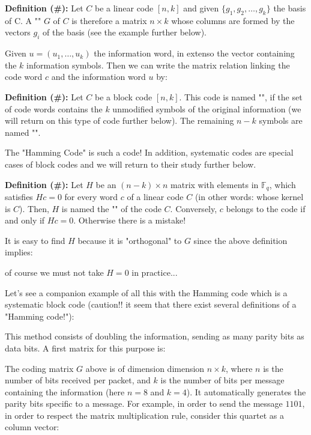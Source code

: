 	\textbf{Definition (\#\mydef):} Let $C$ be a linear code $[n, k]$ and given $\{g_1,g_2,\ldots,g_k\}$ the basis of C. A "" $G$ of $C$ is therefore a matrix $n\times k$ whose columns are formed by the vectors $g_i$ of the basis (see the example further below).

	Given $u=(u_1,\ldots,u_k)$ the information word, in extenso the vector containing the $k$ information symbols. Then we can write the matrix relation linking the code word $c$ and the information word $u$ by:
	
	
	\textbf{Definition (\#\mydef):} Let $C$ be a block code $[n, k]$. This code is named "", if the set of code words contains the $k$ unmodified symbols of the original information (we will return on this type of code further below). The remaining $n-k$ symbols are named "".
	\begin{tcolorbox}[title=Remark,colframe=black,arc=10pt]
	The "Hamming Code" is such a code! In addition, systematic codes are special cases of block codes and we will return to their study further below.
	\end{tcolorbox}
	
	\textbf{Definition (\#\mydef):} Let $H$ be an $(n-k)\times n$ matrix with elements in $\mathbb{F}_q$, which satisfies $Hc=0$ for every word $c$ of a linear code $C$ (in other words: whose kernel is $C$). Then, $H$ is named the "" of the code $C$. Conversely, $c$ belongs to the code if and only if $Hc=0$. Otherwise there is a mistake!
	\begin{tcolorbox}[title=Remark,colframe=black,arc=10pt]
	It is easy to find $H$ because it is "orthogonal" to $G$ since the above definition implies:
	
	of course we must not take $H = 0$ in practice...
	\end{tcolorbox}
	Let's see a companion example of all this with the Hamming code which is a systematic block code (caution!! it seem that there exist several definitions of a "Hamming code!"):

	This method consists of doubling the information, sending as many parity bits as data bits. A first matrix for this purpose is:
	
	The coding matrix $G$ above is of dimension dimension $n\times k$, where $n$ is the number of bits received per packet, and $k$ is the number of bits per message containing the information (here $n=8$ and $k=4$). It automatically generates the parity bits specific to a message. For example, in order to send the message $1101$, in order to respect the matrix multiplication rule, consider this quartet as a column vector:
	
